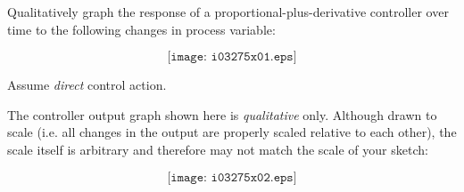 

Qualitatively graph the response of a proportional-plus-derivative controller over time to the following changes in process variable:

$$\texttt{[image: i03275x01.eps]}$$

Assume {\it direct} control action.
 






The controller output graph shown here is {\it qualitative} only.  Although drawn to scale (i.e. all changes in the output are properly scaled relative to each other), the scale itself is arbitrary and therefore may not match the scale of your sketch:

$$\texttt{[image: i03275x02.eps]}$$











